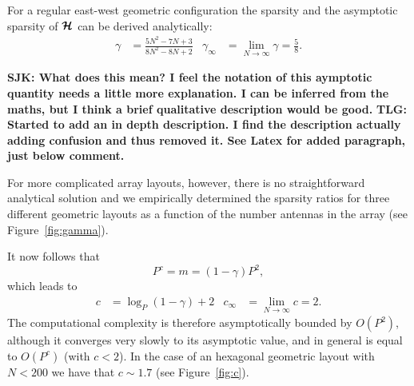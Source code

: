 \documentclass[useAMS,usenatbib]{mn2e}
\newcommand{\bmH}{\bmath{\mathcal{H}}}
\begin{document}
For a regular east-west geometric configuration the sparsity and the asymptotic sparsity of $\bmH$ can be derived analytically:
\begin{align}
\gamma &= \frac{5N^2-7N+3}{8N^2-8N+2} & \gamma_{\infty} &= \lim_{N\rightarrow \infty}\gamma = \frac{5}{8} \label{eq:gamma}. 
\end{align}

{\bf SJK: What does this mean? I feel the notation of this aymptotic quantity needs a little more explanation. I can be inferred from the maths, but I think a brief qualitative description would be good.}
{\bf TLG: Started to add an in depth description. I find the description actually adding confusion and thus removed it. See Latex for added paragraph, just below comment.}

For more complicated array layouts, however, there is no straightforward analytical solution and we empirically determined the sparsity ratios for three different geometric layouts as a function of the number antennas in the array (see Figure~\ref{fig:gamma}). 

It now follows that 
\begin{equation}
P^{c} = m = (1 - \gamma)P^2,
\end{equation}
which leads to
\begin{align}
c &= \log_{P}(1 - \gamma) + 2 & c_{\infty} &= \lim_{N\rightarrow \infty} c = 2. \label{eq:c}
\end{align}
The computational complexity is therefore asymptotically bounded by $O(P^2)$, although it converges very slowly to its asymptotic value, and in general is equal to $O(P^{c})$ (with $c<2$). In the case of an hexagonal geometric layout with $N < 200$ we have that $c \sim 1.7$ (see Figure~\ref{fig:c}).
\end{document}
